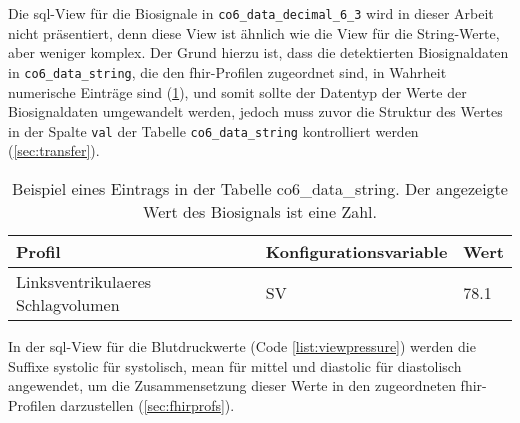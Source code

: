 Die \ac{sql}-View für die Biosignale in \texttt{co6\_data\_decimal\_6\_3} wird in dieser Arbeit nicht präsentiert, denn diese View ist ähnlich wie die View für die String-Werte, aber weniger komplex. Der Grund hierzu ist, dass die detektierten Biosignaldaten in \texttt{co6\_data\_string}, die den \ac{fhir}-Profilen zugeordnet sind, in Wahrheit numerische Einträge sind (\ref{tab:stringvalue}), und somit sollte der Datentyp der Werte der Biosignaldaten umgewandelt werden, jedoch muss zuvor die Struktur des Wertes in der Spalte \texttt{val} der Tabelle \texttt{co6\_data\_string} kontrolliert werden (\ref{sec:transfer}).

\clearpage

\begin{table}[ht]
	\centering 
	\caption[Eintrag in der Tabelle co6\_data\_string]{Beispiel eines Eintrags in der Tabelle co6\_data\_string. Der angezeigte Wert des Biosignals ist eine Zahl.}
	\label{tab:stringvalue}
	\begin{tabular}{|l|l|l|}
		\hline
		\bfseries Profil & \bfseries Konfigurationsvariable & \bfseries Wert \\ \hline
		Linksventrikulaeres Schlagvolumen & SV & 78.1 \\ \hline
	\end{tabular}
\end{table}

In der \ac{sql}-View für die Blutdruckwerte (Code \ref{list:viewpressure}) werden die Suffixe \glqq systolic\grqq{} für systolisch, \glqq mean\grqq{} für mittel und \glqq diastolic\grqq{} für diastolisch angewendet, um die Zusammensetzung dieser Werte in den zugeordneten \ac{fhir}-Profilen darzustellen (\ref{sec:fhirprofs}). 


